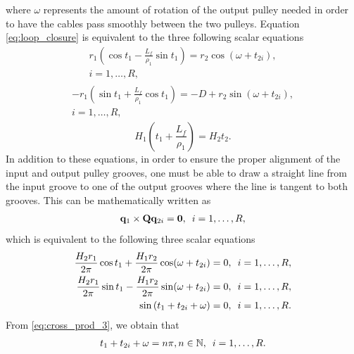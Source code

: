 \documentclass[10pt,cleanfoot]{asme2ej}
\newcommand{\hquad}{\hspace{0.5em}}
\begin{document}
  where $\omega$ represents the amount of rotation of the output pulley needed in order to have the cables pass smoothly between the two pulleys.
  Equation \eqref{eq:loop_closure} is equivalent to the three following scalar equations
  \begin{equation}
  \begin{multlined}
      r_1\left(\cos t_1 -\frac{L_f}{\rho_1}\sin t_1\right)=r_2\cos\left(\omega+t_{2i}\right),\\ i=1 ,\ldots , R,\label{eq:loop_closure_deriv1}
      \end{multlined}
      \end{equation}
      \begin{align}
      \begin{multlined}
      -r_1\left(\sin t_1 + \frac{L_f}{\rho_1}\cos t_1\right)=-D+r_2\sin\left(\omega+t_{2i}\right),\\ i=1 ,\ldots , R,\label{eq:loop_closure_deriv2}
      \end{multlined}
      \end{align}
      \begin{equation}
      H_1\left(t_1+\frac{L_f}{\rho_1}\right) = H_2t_2.\label{eq:loop_closure_deriv3}
  \end{equation}
  In addition to these equations, in order to ensure the proper alignment of the input and output pulley grooves, one must be able to draw a straight line from the input groove to one of the output grooves where the line is tangent to both grooves. This can be mathematically written as 
  \begin{align}
      \mathbf{q}_1 \times \mathbf{Q}\mathbf{q}_{2i} = \mathbf{0},\hquad i=1 ,\ldots , R,
  \end{align}
  which is equivalent to the following three scalar equations 
  \begin{align}
      \frac{H_2r_1}{2\pi}\cos t_1 + \frac{H_1r_2}{2\pi}\cos(\omega+t_{2i})=0,\hquad i=1 ,\ldots , R,\label{eq:cross_prod_1}\\
      \frac{H_2r_1}{2\pi}\sin t_1-\frac{H_1r_2}{2\pi}\sin(\omega + t_{2i})=0,\hquad i=1 ,\ldots , R,\label{eq:cross_prod_2}\\
      \sin\left(t_1+t_{2i}+\omega\right)=0,\hquad i=1 ,\ldots , R.\label{eq:cross_prod_3}
  \end{align}
From \eqref{eq:cross_prod_3}, we obtain that
\begin{align}
    t_1+t_{2i}+\omega = n\pi, n\in \mathbb{N},\hquad i = 1,\ldots ,R.\label{eq:cross_prod_deriv1}
\end{align}
\end{document}
